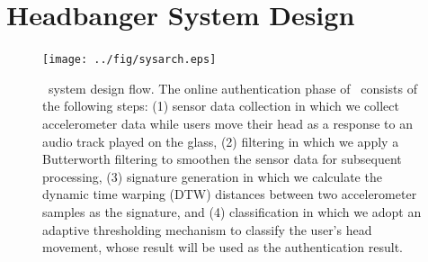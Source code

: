 
\section{Headbanger System Design}
\label{sec:design}

\begin{figure}[h]
\centering
\texttt{[image: ../fig/sysarch.eps]}
\caption{\systemname~system design flow. The online authentication phase of \systemname~consists of the following steps: (1) sensor data collection in which we collect accelerometer data while users move their head as a response to an audio track played on the glass, (2) filtering in which we apply a Butterworth filtering to smoothen the sensor data for subsequent processing, (3) signature generation in which we calculate the dynamic time warping (DTW) distances between two accelerometer samples as the signature, and (4) classification in which we adopt an adaptive thresholding mechanism to classify the user's head movement, whose result will be used as the authentication result.}
\label{fig:sysarch}
\end{figure}

